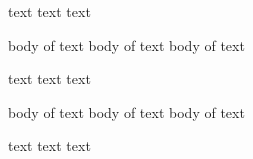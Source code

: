 text text text
\begin{myenv}
  body of text 
  body of text 
  body of text 
   

\end{myenv}




text text text

\begin{cmh}
  body of text 
  body of text 
  body of text 
\end{cmh}
text text text
